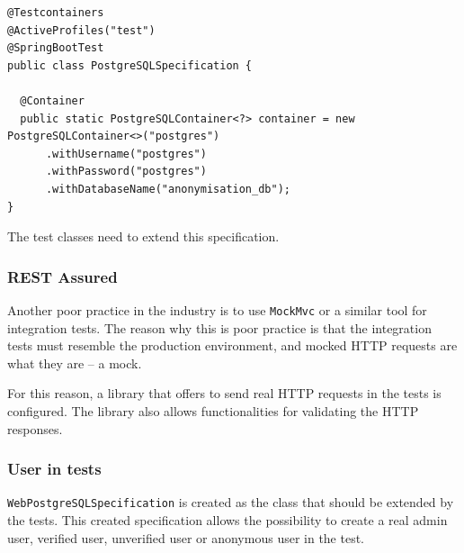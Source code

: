 \documentclass[a4paper,twoside,12pt]{book}
\begin{document}
\begin{verbatim}
@Testcontainers
@ActiveProfiles("test")
@SpringBootTest
public class PostgreSQLSpecification {

  @Container
  public static PostgreSQLContainer<?> container = new PostgreSQLContainer<>("postgres")
      .withUsername("postgres")
      .withPassword("postgres")
      .withDatabaseName("anonymisation_db");
}
\end{verbatim}

The test classes need to extend this specification.

\subsubsection{REST Assured}

Another poor practice in the industry is to use \verb|MockMvc| or a similar tool for integration tests. The reason why this is poor practice is that the integration tests must resemble the production environment, and mocked HTTP requests are what they are -- a mock.

For this reason, a library that offers to send real HTTP requests in the tests is configured. The library also allows functionalities for validating the HTTP responses.

\subsubsection{User in tests}

\verb|WebPostgreSQLSpecification| is created as the class that should be extended by the tests. This created specification allows the possibility to create a real admin user, verified user, unverified user or anonymous user in the test.
\end{document}
